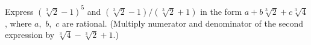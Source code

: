 Express $(\sqrt[3]{2} - 1)^{5}$ and $(\sqrt[3]{2} - 1)/(\sqrt[3]{2} + 1)$ in the form $a + b\sqrt[3]{2} + c\sqrt[3]{4}$,
where $a$,~$b$,~$c$ are rational. (Multiply numerator and denominator of the
second expression by $\sqrt[3]{4} - \sqrt[3]{2} + 1$.)

